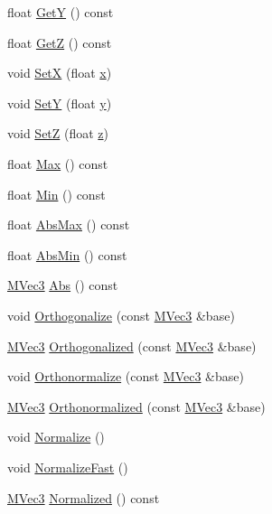 \begin{CompactItemize}
\item 
float \hyperlink{class_m_vec3_dfadf4adb521222d91980376a7679dc8}{GetY} () const 
\item 
float \hyperlink{class_m_vec3_8b29390479c105bbb9926188b9742329}{GetZ} () const 
\item 
void \hyperlink{class_m_vec3_7ab6073bcf8afbcf630ad8f2ae8992b8}{SetX} (float \hyperlink{wglext_8h_d77deca22f617d3f0e0eb786445689fc}{x})
\item 
void \hyperlink{class_m_vec3_128947a1f8cbc74a87b3b66454dfbb86}{SetY} (float \hyperlink{wglext_8h_9298c7ad619074f5285b32c6b72bfdea}{y})
\item 
void \hyperlink{class_m_vec3_bf45cf723890eedc23d0aa9eaf4a578a}{SetZ} (float \hyperlink{glext__bak_8h_5b27107fca91cf19a778530405575b37}{z})
\item 
float \hyperlink{class_m_vec3_c34a45816652b6f59fe6300cdc336a58}{Max} () const 
\item 
float \hyperlink{class_m_vec3_85c543975270d4dc429b62edec1a853d}{Min} () const 
\item 
float \hyperlink{class_m_vec3_cc02bb64689686727d03d6f49948cc06}{AbsMax} () const 
\item 
float \hyperlink{class_m_vec3_6bab49220a80edba7d84375688519850}{AbsMin} () const 
\item 
\hyperlink{class_m_vec3}{MVec3} \hyperlink{class_m_vec3_7a6718b309fae2ed8362a365a92f815c}{Abs} () const 
\item 
void \hyperlink{class_m_vec3_8aa706611d3bd87a40fbf85d51a459fd}{Orthogonalize} (const \hyperlink{class_m_vec3}{MVec3} \&base)
\item 
\hyperlink{class_m_vec3}{MVec3} \hyperlink{class_m_vec3_d784fa93a877a935c5fdf37f9cd7a505}{Orthogonalized} (const \hyperlink{class_m_vec3}{MVec3} \&base)
\item 
void \hyperlink{class_m_vec3_65c10253d74af1520788361ca191cd50}{Orthonormalize} (const \hyperlink{class_m_vec3}{MVec3} \&base)
\item 
\hyperlink{class_m_vec3}{MVec3} \hyperlink{class_m_vec3_90de66244ee48f99a07924deb28a9d35}{Orthonormalized} (const \hyperlink{class_m_vec3}{MVec3} \&base)
\item 
void \hyperlink{class_m_vec3_89f60c8001f1e04e5d17327e3b9ada63}{Normalize} ()
\item 
void \hyperlink{class_m_vec3_d91e67a5315d1817256acae9fc00a849}{NormalizeFast} ()
\item 
\hyperlink{class_m_vec3}{MVec3} \hyperlink{class_m_vec3_139cf1db336ecf0ca02157f6f3605647}{Normalized} () const 

\end{CompactItemize}
